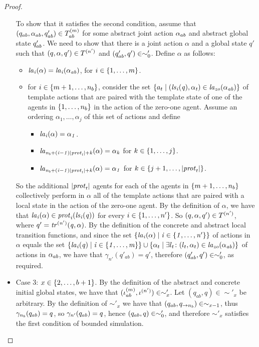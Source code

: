 \documentclass{article}
\begin{document}
\begin{proof}
\begin{itemize}
  To show that it satisfies the second condition, assume that $(q_{ab},
  \alpha_{ab}, q_{ab}') \in T^{(m)}_{ab}$ for some abstract joint action
  $\alpha_{ab}$ and abstract global state $q_{ab}'$. We need to show that there
  is a joint action $\alpha$ and a  global state $q'$ such that $(q, \alpha, q')
  \in T^{(n')}$ and $(q_{ab}', q') \in \sim'_0$.  
Define $\alpha$ as
  follows:

  \begin{itemize}
      \item $\it{la}_{i}({\alpha}) = \it{la}_{i}({\alpha_{ab}})$, for $i \in \left \{ 1,\ldots,m \right \}$.
      \item  for $i \in \left \{ m+1,\ldots,n_b \right \}$, consider the set $\left \{ a_t \mid (\it{ls}_{i}(q),\alpha_t) \in \it{la}_{zo}({\alpha_{ab}}) \right \}$ of template actions
          that are paired with the template state of one of the agents in $\left \{ 1,\ldots,n_b \right \}$
    in the action of the zero-one agent. Assume an ordering $\alpha_1, \ldots,
    \alpha_j$ of this set of  actions and define
    \begin{itemize}
        \item $\it{la}_{i}({\alpha}) = \alpha_1$.
        \item  $\it{la}_{n_b + (i -1) |\mathit{prot}_{t}| + k}({\alpha}) = \alpha_k$  for $k \in \left \{ 1,\ldots,j \right \}$.
    \item $\it{la}_{n_b + (i-1) |\mathit{prot}_{t}| + k}({\alpha}) = \alpha_1$ for $k \in
    \left \{ j+1, \ldots, |\mathit{prot}_{t}| \right \}$.
    \end{itemize}
  \end{itemize}

So the additional $|\mathit{prot}_{t}|$ agents for each of the agents in
        $\left \{ m+1,\ldots,n_b \right \}$ collectively perform in $\alpha$ all of the template actions
        that are paired with a local state in the action of  the zero-one
        agent. By the definition of $\alpha$, we have that $\it{la}_{i}({\alpha}) \in \mathit{prot}_{i}(\it{ls}_{i}(q))$ for every $i \in \left \{ 1,\ldots,n' \right \}$. So $(q, \alpha, q') \in T^{(n')}$, where $q' = \it{tr}^{(n')} (q, \alpha)$. By the definition of the
  concrete and abstract local transition functions, and since the set
        $\left \{ \it{la}_{i}({\alpha}) \mid i \in \left \{ 1,\ldots,n' \right \} \right \}$ of actions in $\alpha$ equals the set
  $\left \{ \it{la}_{i}({q}) \mid i \in \left \{ 1,\ldots,m \right \} \right \} \cup \left \{ \alpha_t \mid \exists
  l_t \colon (l_t, \alpha_t) \in \it{la}_{zo}({\alpha_{ab}}) \right \}$ of actions in $\alpha_{ab}$,
        we have that $\gamma_{n'}(q'_{ab}) = q'$, therefore
  $(q_{ab}', q') \in \sim'_0$, as required. 


  \item Case 3: $x \in \left \{ 2, \ldots, b+1 \right \}$.  By the definition of the
      abstract and concrete initial global states, we have that $(\iota^{({m})}_{ab}, \iota^{({n'})}) \in \sim'_x$. Let $(q_{ab}, q) \in \sim'_x$ be
        arbitrary. By the definition of $\sim'_x$ we have that $(q_{ab},
        q_{\rightarrow n_b}) \in \sim_{x-1}$, thus $\gamma_{n_b}(q_{ab}) =
        q$, so $\gamma_{n'}(q_{ab}) = q$, hence $(q_{ab}, q) \in \sim'_0$,
        and therefore $\sim'_{x}$ satisfies the first condition of bounded
        simulation. 



\end{itemize}
\end{proof}
\end{document}

